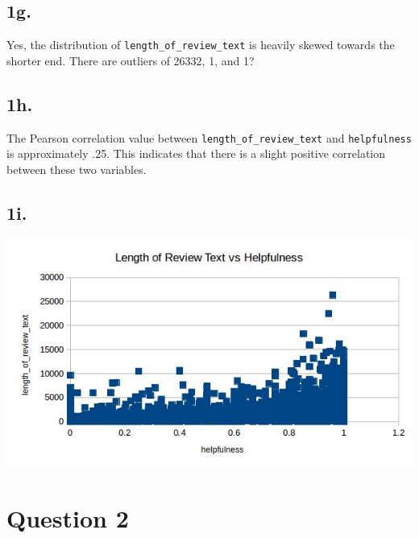 \documentclass{article}
\begin{document}
\subsection{1g.}
Yes, the distribution of \texttt{length\_of\_review\_text}  is heavily skewed towards the shorter end. There are outliers of 26332, 1, and 1?

\subsection{1h.}
The Pearson correlation value between \texttt{length\_of\_review\_text} and \texttt{helpfulness} is approximately .25. This indicates that there is a slight positive correlation between these two variables.

\subsection{1i.}
\begin{center}
\includegraphics[keepaspectratio, scale=0.5]{scatter.jpg}

\section{Question 2}


\end{center}
\end{document}
